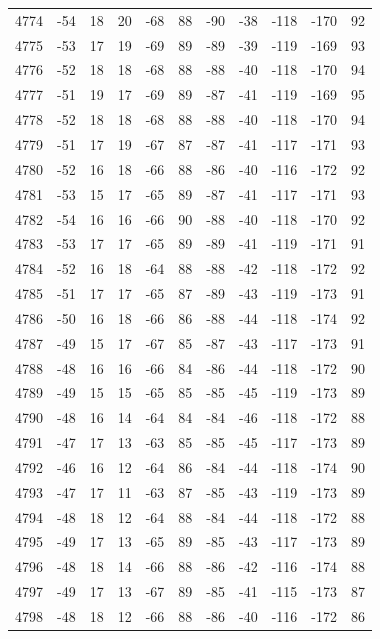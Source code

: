 \begin{table}[H]
\begin{tabular}{lllllllllll}
4774 & -54 & 18 & 20 & -68 & 88 & -90 & -38 & -118 & -170 & 92 \\
4775 & -53 & 17 & 19 & -69 & 89 & -89 & -39 & -119 & -169 & 93 \\
4776 & -52 & 18 & 18 & -68 & 88 & -88 & -40 & -118 & -170 & 94 \\
4777 & -51 & 19 & 17 & -69 & 89 & -87 & -41 & -119 & -169 & 95 \\
4778 & -52 & 18 & 18 & -68 & 88 & -88 & -40 & -118 & -170 & 94 \\
4779 & -51 & 17 & 19 & -67 & 87 & -87 & -41 & -117 & -171 & 93 \\
4780 & -52 & 16 & 18 & -66 & 88 & -86 & -40 & -116 & -172 & 92 \\
4781 & -53 & 15 & 17 & -65 & 89 & -87 & -41 & -117 & -171 & 93 \\
4782 & -54 & 16 & 16 & -66 & 90 & -88 & -40 & -118 & -170 & 92 \\
4783 & -53 & 17 & 17 & -65 & 89 & -89 & -41 & -119 & -171 & 91 \\
4784 & -52 & 16 & 18 & -64 & 88 & -88 & -42 & -118 & -172 & 92 \\
4785 & -51 & 17 & 17 & -65 & 87 & -89 & -43 & -119 & -173 & 91 \\
4786 & -50 & 16 & 18 & -66 & 86 & -88 & -44 & -118 & -174 & 92 \\
4787 & -49 & 15 & 17 & -67 & 85 & -87 & -43 & -117 & -173 & 91 \\
4788 & -48 & 16 & 16 & -66 & 84 & -86 & -44 & -118 & -172 & 90 \\
4789 & -49 & 15 & 15 & -65 & 85 & -85 & -45 & -119 & -173 & 89 \\
4790 & -48 & 16 & 14 & -64 & 84 & -84 & -46 & -118 & -172 & 88 \\
4791 & -47 & 17 & 13 & -63 & 85 & -85 & -45 & -117 & -173 & 89 \\
4792 & -46 & 16 & 12 & -64 & 86 & -84 & -44 & -118 & -174 & 90 \\
4793 & -47 & 17 & 11 & -63 & 87 & -85 & -43 & -119 & -173 & 89 \\
4794 & -48 & 18 & 12 & -64 & 88 & -84 & -44 & -118 & -172 & 88 \\
4795 & -49 & 17 & 13 & -65 & 89 & -85 & -43 & -117 & -173 & 89 \\
4796 & -48 & 18 & 14 & -66 & 88 & -86 & -42 & -116 & -174 & 88 \\
4797 & -49 & 17 & 13 & -67 & 89 & -85 & -41 & -115 & -173 & 87 \\
4798 & -48 & 18 & 12 & -66 & 88 & -86 & -40 & -116 & -172 & 86 \\

\end{tabular}
\end{table}
